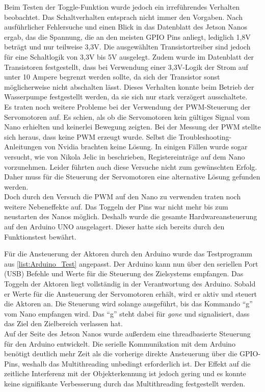 Beim Testen der Toggle-Funktion wurde jedoch ein irreführendes Verhalten beobachtet. Das Schaltverhalten entsprach nicht immer den Vorgaben. Nach ausführlicher Fehlersuche und einen Blick in das Datenblatt des Jetson Nanos ergab, das die Spannung, die an den meisten \ac{GPIO} Pins anliegt, lediglich 1,8V beträgt und nur teilweise 3,3V. Die ausgewählten Transistortreiber sind jedoch für eine Schaltlogik von 3,3V bis 5V ausgelegt. Zudem wurde im Datenblatt der Transistoren festgestellt, dass bei Verwendung einer 3,3V-Logik der Strom auf unter 10 Ampere begrenzt werden sollte, da sich der Transistor sonst möglicherweise nicht abschalten lässt. Dieses Verhalten konnte beim Betrieb der Wasserpumpe festgestellt werden, da sie sich nur stark verzögert ausschaltete.
\\
Es traten noch weitere Probleme bei der Verwendung der \ac{PWM}-Steuerung der Servomotoren auf. Es schien, als ob die Servomotoren kein gültiges Signal vom Nano erhielten und keinerlei Bewegung zeigten. Bei der Messung der \ac{PWM} stellte sich heraus, dass keine \ac{PWM} erzeugt wurde. Selbst die Troubleshooting-Anleitungen von Nvidia brachten keine Lösung. In einigen Fällen wurde sogar versucht, wie von Nikola Jelic in \cite{forum_wrong_pwm} beschrieben, Registereinträge auf dem Nano vorzunehmen. Leider führten auch diese Versuche nicht zum gewünschten Erfolg. Daher muss für die Steuerung der Servomotoren eine alternative Lösung gefunden werden.
\\
Doch durch den Versuch die \ac{PWM} auf den Nano zu verwenden traten noch weitere Nebeneffekte auf. Das Toggeln der Pins war nicht mehr bis zum neustarten des Nanos möglich. Deshalb wurde die gesamte Hardwareansteuerung auf den Arduino UNO ausgelagert. Dieser hatte sich bereits durch den Funktionstest bewährt.

Für die Ansteuerung der Aktoren durch den Arduino wurde das Testprogramm aus \ref{list:Arduino_Test} angepasst. Der Arduino kann nun über den seriellen Port (USB) Befehle und Werte für die Steuerung des Zielsystems empfangen. Das Toggeln der Aktoren liegt vollständig in der Verantwortung des Arduino. Sobald er Werte für die Ansteuerung der Servomotoren erhält, wird er aktiv und steuert die Aktoren an. Die Steuerung wird solange ausgeführt, bis das Kommando \enquote{g} vom Nano empfangen wird. Das \enquote{g} steht dabei für \textit{gone} und signalisiert, dass das Ziel den Zielbereich verlassen hat.
\\
Auf der Seite des Jetson Nanos wurde außerdem eine threadbasierte Steuerung für den Arduino entwickelt. Die serielle Kommunikation mit dem Arduino benötigt deutlich mehr Zeit als die vorherige direkte Ansteuerung über die \ac{GPIO}-Pins, weshalb das Multithreading unbedingt erforderlich ist. Der Effekt auf die zeitliche Interferenz mit der Objekterkennung ist jedoch gering und es konnte keine signifikante Verbesserung durch das Multithreading festgestellt werden.

